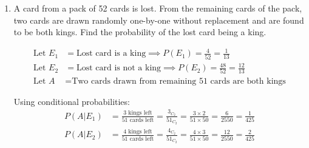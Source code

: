 \begin{enumerate}[label=\thesubsection.\arabic*, ref=\thesubsection.\theenumi]
Now, apply row operations to evaluate the determinant:
\begin{align}
R_2 &\to R_2 - R_1 \\
R_3 &\to R_3 - R_1
\end{align}

$$\Delta = (1 + xyz) \begin{vmatrix} 1 & x & x^2 \\ 0 & y-x & y^2-x^2 \\ 0 & z-x & z^2-x^2 \end{vmatrix}$$

Take $(y-x)$ common from $R_2$ and $(z-x)$ common from $R_3$:
$$\Delta = (1 + xyz)(y - x)(z - x) \begin{vmatrix} 1 & x & x^2 \\ 0 & 1 & y+x \\ 0 & 1 & z+x \end{vmatrix}$$

\begin{align*}
\Delta &= (1 + xyz)(y - x)(z - x) [1 \cdot (z + x - (y + x))] \\
&= (1 + xyz)(y - x)(z - x)(z - y) \\
&= (1 + xyz)(x - y)(y - z)(z - x)
\end{align*}

We are given that $\Delta = 0$:
$$(1 + xyz)(x - y)(y - z)(z - x) = 0$$

Since $x, y, z$ are distinct, $(x - y) \neq 0$, $(y - z) \neq 0$, and $(z - x) \neq 0$.

Therefore:
$$1 + xyz = 0$$



\item

A card from a pack of 52 cards is lost. From the remaining cards of the pack, two cards are drawn randomly one-by-one without replacement and are found to be both kings. Find the probability of the lost card being a king.   

\solution 

\begin{align*}
\text{Let } E_1 &= \text{Lost card is a king} \implies P(E_1) = \frac{4}{52} = \frac{1}{13} \\
\text{Let } E_2 &= \text{Lost card is not a king} \implies P(E_2) = \frac{48}{52} = \frac{12}{13} \\
\text{Let } A &= \text{Two cards drawn from remaining 51 cards are both kings}
\end{align*}

Using conditional probabilities:
\begin{align*}
P(A | E_1) &= \frac{\text{3 kings left}}{\text{51 cards left}} = \frac{3_{C_2}}{51_{C_2}} = \frac{3 \times 2}{51 \times 50} = \frac{6}{2550} = \frac{1}{425} \\
P(A | E_2) &= \frac{\text{4 kings left}}{\text{51 cards left}} = \frac{4_{C_2}}{51_{C_2}} = \frac{4 \times 3}{51 \times 50} = \frac{12}{2550} = \frac{2}{425}
\end{align*}


\end{enumerate}
